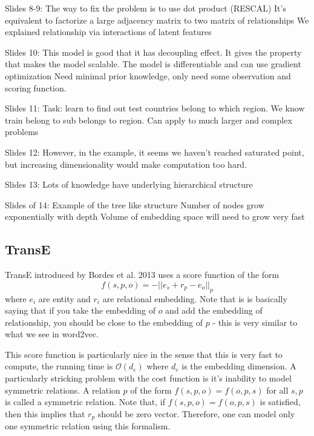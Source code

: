 Slides 8-9:
The way to fix the problem is to use dot product (RESCAL)
It’s equivalent to factorize a large adjacency matrix to two matrix of relationships
We explained relationship via interactions of latent features

Slides 10:
This model is good that it has decoupling effect. It gives the property that makes the model scalable.
The model is differentiable and can use gradient optimization 
Need minimal prior knowledge, only need some observation and scoring function.

Slides 11:
Task: learn to find out test countries belong to which region.
We know train belong to sub belongs to region.
Can apply to much larger and complex problems

Slides 12:
However, in the example, it seems we haven’t reached saturated point, but increasing dimensionality would make computation too hard.

Slides 13:
Lots of knowledge have underlying hierarchical structure 

Slides of 14:
Example of the tree like structure
Number of nodes grow exponentially with depth
Volume of embedding space will need to grow very fast



\subsection{TransE}
TransE introduced by Bordes et al. 2013 uses a score function of the form $$ f(s, p, o) = -|| e_s + r_p - e_o ||_p $$ where $e_i$ are entity and $r_i$ are relational embedding. Note that is is basically saying that if you take the embedding of $o$ and add the embedding of relationship, you should be close to the embedding of $p$ - this is very similar to what we see in word2vec. 

This score function is particularly nice in the sense that this is very fast to compute, the running time is $\mathcal{O}(d_e)$ where $d_e$ is the embedding dimension. A particularly stricking problem with the cost function is it's inability to model symmetric relations. A relation $p$ of the form $f(s, p, o) = f(o, p, s)$ for all $s, p$ is called a symmetric relation. Note that, if $f(s, p, o) = f(o, p, s)$ is satisfied, then this implies that $r_p$ should be zero vector. Therefore, one can model only one symmetric relation using this formalism. 

